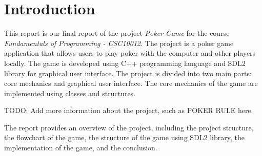 \section{Introduction}
\label{sec:introduction}

\hspace{1cm} This report is our final report of the project \textit{Poker Game} for the course \textit{Fundamentals of Programming - CSC10012}. The project is a poker game application that allows users to play poker with the computer and other players locally. The game is developed using C++ programming language and SDL2 library for graphical user interface. The project is divided into two main parts: core mechanics and graphical user interface. The core mechanics of the game are implemented using classes and structures.

\vspace{0.5cm}

\hspace{1cm} TODO: Add more information about the project, such as POKER RULE here.

\vspace{0.5cm}

\hspace{1cm} The report provides an overview of the project, including the project structure, the flowchart of the game, the structure of the game using SDL2 library, the implementation of the game, and the conclusion.

